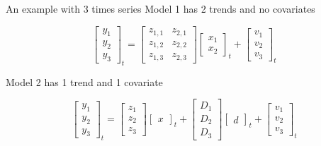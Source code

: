 \documentclass[
  ignorenonframetext,
]{beamer}
\begin{document}
\begin{frame}{An example with 3 times series}
\protect\hypertarget{an-example-with-3-times-series}{}
Model 1 has 2 trends and no covariates

\[
\begin{bmatrix}
 y_1 \\
 y_2 \\
 y_3 
\end{bmatrix}_t =
\begin{bmatrix}
 z_{1,1} & z_{2,1} \\
 z_{1,2} & z_{2,2} \\
 z_{1,3} & z_{2,3}
\end{bmatrix}
\begin{bmatrix}
 x_1 \\
 x_2 
\end{bmatrix}_t +
\begin{bmatrix}
 v_1 \\
 v_2 \\
 v_3 
\end{bmatrix}_t
\]

Model 2 has 1 trend and 1 covariate

\[
\begin{bmatrix}
 y_1 \\
 y_2 \\
 y_3 
\end{bmatrix}_t =
\begin{bmatrix}
 z_1 \\
 z_2 \\
 z_3 
\end{bmatrix}
\begin{bmatrix}
 x
\end{bmatrix}_t +
\begin{bmatrix}
 D_1 \\
 D_2 \\
 D_3 
\end{bmatrix}
\begin{bmatrix}
 d
\end{bmatrix}_t +
\begin{bmatrix}
 v_1 \\
 v_2 \\
 v_3 
\end{bmatrix}_t
\]
\end{frame}
\end{document}
